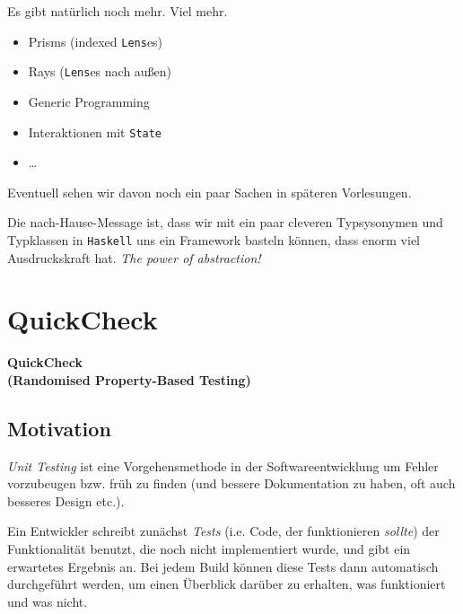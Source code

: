 \documentclass{beamer}
\begin{document}

\begin{frame}

Es gibt natürlich noch mehr. Viel mehr.
\pause

\begin{itemize}
\item Prisms (indexed \texttt{Lens}es)
\item Rays (\texttt{Lens}es nach außen)
\item Generic Programming
\item Interaktionen mit \texttt{State}
\item \dots
\end{itemize}
\pause

Eventuell sehen wir davon noch ein paar Sachen in späteren Vorlesungen.\smallskip\smallskip

Die nach-Hause-Message ist, dass wir mit ein paar cleveren Typsysonymen und Typklassen in \texttt{Haskell} uns ein Framework basteln können, dass enorm viel Ausdruckskraft hat. \emph{The power of abstraction!}

\end{frame}

\section{QuickCheck}

\begin{frame}

\begin{center}
\Large
\textbf{QuickCheck\\(Randomised Property-Based Testing)}
\end{center}

\end{frame}

\subsection{Motivation}

\begin{frame}
\emph{Unit Testing} ist eine Vorgehensmethode in der Softwareentwicklung um Fehler
vorzubeugen bzw. früh zu finden (und bessere Dokumentation zu haben, oft auch besseres Design etc.).
\bigskip

Ein Entwickler schreibt zunächst \emph{Tests} (i.e. Code, der funktionieren \textit{sollte})
der Funktionalität benutzt, die noch nicht implementiert wurde, und gibt ein erwartetes
Ergebnis an. Bei jedem Build können diese Tests dann automatisch durchgeführt werden, um einen Überblick darüber zu erhalten, was funktioniert und was nicht.
\end{frame}
\end{document}
